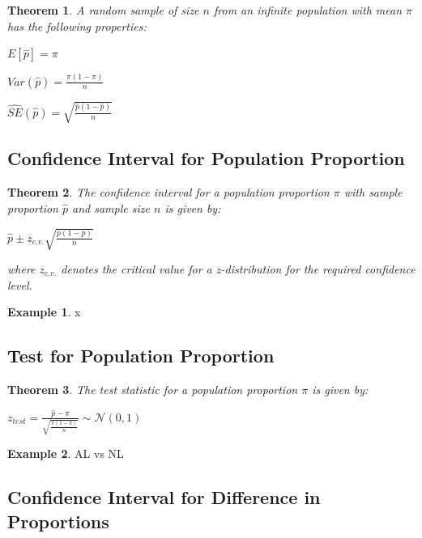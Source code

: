 \documentclass[
  11pt,
]{book}
\newtheorem{theorem}{Theorem}[chapter]
\theoremstyle{definition}
\theoremstyle{definition}
\newtheorem{example}{Example}[chapter]
\theoremstyle{definition}
\theoremstyle{definition}
\theoremstyle{remark}
\begin{document}
\newpage

\begin{theorem}
A random sample of size \(n\) from an infinite population with mean \(\pi\) has the following properties:

\(E[\hat{p}] = \pi\)

\(Var(\hat{p}) = \frac{\pi(1-\pi)}{n}\)

\(\hat{SE}(\hat{p}) = \sqrt{\frac{\hat{p}(1-\hat{p})}{n}}\)
\end{theorem}

\hypertarget{confidence-interval-for-population-proportion}{%
\subsection{Confidence Interval for Population Proportion}\label{confidence-interval-for-population-proportion}}

\begin{theorem}
The confidence interval for a population proportion \(\pi\) with sample proportion \(\hat{p}\) and sample size \(n\) is given by:

\(\hat{p} \pm z_{c.v.}\sqrt{\frac{p(1-p)}{n}}\)

where \(z_{c.v.}\) denotes the critical value for a z-distribution for the required confidence level.
\end{theorem}

\begin{example}
x
\end{example}

\newpage

\hypertarget{test-for-population-proportion}{%
\subsection{Test for Population Proportion}\label{test-for-population-proportion}}

\begin{theorem}
The test statistic for a population proportion \(\pi\) is given by:

\(z_{test} = \frac{\hat{p}-\pi}{\sqrt{\frac{\pi(1-\pi)}{n}}} \sim \mathcal{N}(0,1)\)
\end{theorem}

\begin{example}
AL vs NL
\end{example}

\newpage

\hypertarget{confidence-interval-for-difference-in-proportions}{%
\subsection{Confidence Interval for Difference in Proportions}\label{confidence-interval-for-difference-in-proportions}}
\end{document}
